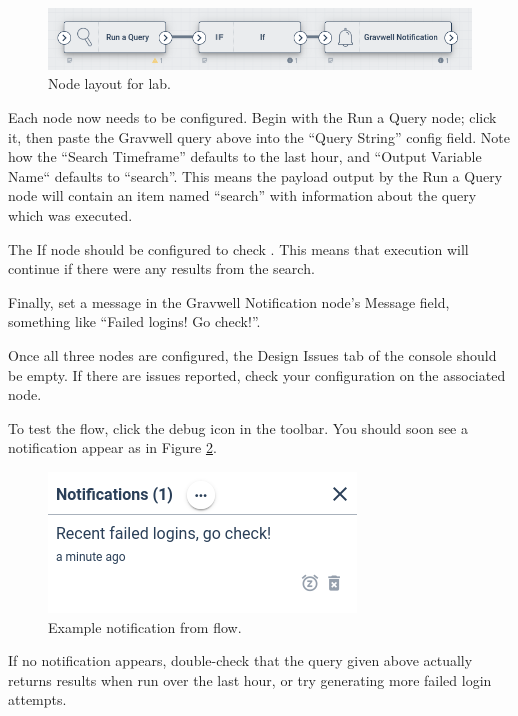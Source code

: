\begin{figure}
	\includegraphics[width=0.7\linewidth]{images/lab-nodes.png}
	\caption{Node layout for lab.}
	\label{fig:lab-nodes}
\end{figure}

Each node now needs to be configured. Begin with the Run a Query node; click it, then paste the Gravwell query above into the ``Query String'' config field. Note how the ``Search Timeframe'' defaults to the last hour, and ``Output Variable Name`` defaults to ``search''. This means the payload output by the Run a Query node will contain an item named ``search'' with information about the query which was executed.

The If node should be configured to check . This means that execution will continue if there were any results from the search.

Finally, set a message in the Gravwell Notification node's Message field, something like ``Failed logins! Go check!''.

Once all three nodes are configured, the Design Issues tab of the console should be empty. If there are issues reported, check your configuration on the associated node.

To test the flow, click the debug icon in the toolbar. You should soon see a notification appear as in Figure \ref{fig:lab-notification}.

\begin{figure}
	\includegraphics[width=0.7\linewidth]{images/lab-notification.png}
	\caption{Example notification from flow.}
	\label{fig:lab-notification}
\end{figure}

If no notification appears, double-check that the query given above actually returns results when run over the last hour, or try generating more failed login attempts.

